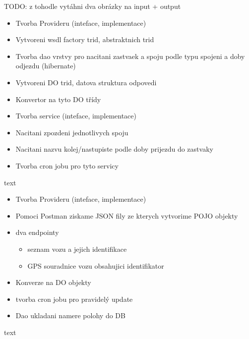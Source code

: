 TODO: z tohodle vytáhni dva obrázky na input + output
 
\begin{itemize}
	\item Tvorba Provideru (inteface, implementace)
	\item Vytvoreni wsdl factory trid, abstraktnich trid
	\item Tvorba dao vrstvy pro nacitani zastvaek a spoju podle typu spojeni a doby odjezdu (hibernate)
	\item Vytvoreni DO trid, datova struktura odpovedi  
	\item Konvertor na tyto DO třídy
	\item Tvorba service (inteface, implementace)
	\item Nacitani zpozdeni jednotlivych spoju
	\item Nacitani nazvu kolej/nastupiste podle doby prijezdu do zastvaky
	\item Tvorba cron jobu pro tyto servicy
\end{itemize}

text

\begin{itemize}
	\item Tvorba Provideru (inteface, implementace)
	\item Pomoci Postman ziskame JSON fily ze kterych vytvorime POJO objekty
	\item dva endpointy
	\begin{itemize}
		\item seznam vozu a jejich identifikace
		\item GPS souradnice vozu obsahujici identifikator
	\end{itemize}
	\item Konverze na DO objekty
	\item tvorba cron jobu pro pravidelý update
	\item Dao ukladani namere polohy do DB
\end{itemize}

text

